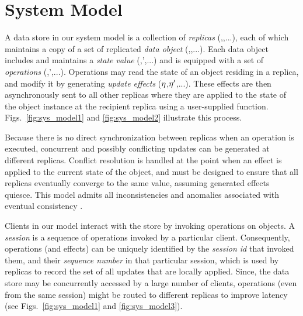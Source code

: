 \section{System Model}
\label{sec:sys_model}

A data store in our system model is a collection of \emph{replicas}
(,,...), each of which maintains a copy of a set of
replicated \emph{data object} (\xO,\yO,...).  Each data object includes
and maintains a \emph{state value} (\vO,\vO',...) and is equipped with a set of \emph{operations}
(\opO,\opO',...). Operations may read the state of an object
residing in a replica, and modify it by generating \emph{update
effects} ($\eta$,$\eta'$,...).
These effects are then asynchronously sent to all other replicas where
they are applied to the state of the object instance at the recipient
replica using a user-supplied function.
Figs.~\ref{fig:sys_model1} and \ref{fig:sys_model2} illustrate this
process.


Because there is no direct synchronization between replicas when an
operation is executed, concurrent and possibly conflicting updates can
be generated at different replicas.  Conflict resolution is handled at
the point when an effect is applied to the current state of the
object, and must be designed to ensure that all replicas eventually
converge to the same value, assuming generated effects quiesce.  This
model admits all inconsistencies and anomalies associated with
eventual consistency \cite{quelea,terry}.

Clients in our model interact with the store by invoking operations on
objects.  A \emph{session} is a sequence of operations invoked by a
particular client. Consequently, operations (and effects) can be
uniquely identified by the \emph{session id} that invoked them, and
their \emph{sequence number} in that particular session, which is used
by replicas to record the set of all updates that are locally applied.
Since, the data store may be concurrently accessed by a large number
of clients, operations (even from the same session) might be routed to
different replicas to improve latency (see Figs.~\ref{fig:sys_model1}
and \ref{fig:sys_model3}).

